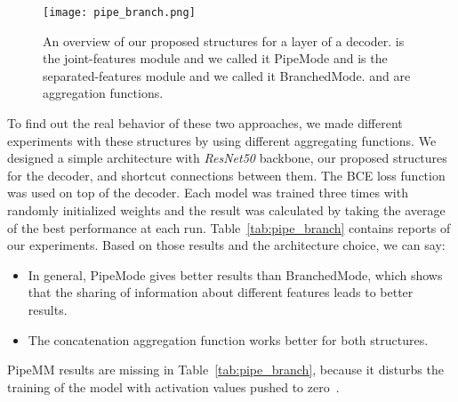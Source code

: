 \documentclass[10pt,twocolumn,letterpaper]{article}
\begin{document}
\begin{figure}[t]
\begin{center}
\texttt{[image: pipe\_branch.png]}
\end{center}
   \caption{An overview of our proposed structures for a layer of a decoder.  is the joint-features module and we called it PipeMode and  is the separated-features module and we called it BranchedMode.  and  are aggregation functions.}
\label{fig:pipe_branch}
\end{figure}
To find out the real behavior of these two approaches, we made different experiments with these structures by using different aggregating functions. We designed a simple architecture with \textit{ResNet50} backbone, our proposed structures for the decoder, and shortcut connections between them. The BCE loss function was used on top of the decoder. Each model was trained three times with randomly initialized weights and the result was calculated by taking the average of the best performance at each run. Table~\ref{tab:pipe_branch} contains reports of our experiments.
Based on those results and the architecture choice, we can say:
\begin{itemize}
  \item In general, PipeMode gives better results than BranchedMode, which shows that the sharing of information about different features leads to better results.
  \item The concatenation aggregation function works better for both structures.
\end{itemize}
PipeMM results are missing in Table~\ref{tab:pipe_branch}, because it disturbs the training of the model with activation values pushed to zero~\cite{glorot}.
\end{document}
